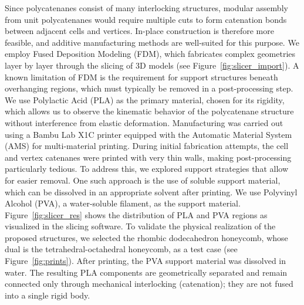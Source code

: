 \documentclass[times,twocolumn,final]{elsarticle}
\begin{document}
Since polycatenanes consist of many interlocking structures, modular assembly from unit polycatenanes would require multiple cuts to form catenation bonds between adjacent cells and vertices. In-place construction is therefore more feasible, and additive manufacturing methods are well-suited for this purpose. We employ Fused Deposition Modeling (FDM), which fabricates complex geometries layer by layer through the slicing of 3D models (see Figure~\ref{fig:slicer_import}). A known limitation of FDM is the requirement for support structures beneath overhanging regions, which must typically be removed in a post-processing step.
We use Polylactic Acid (PLA) as the primary material, chosen for its rigidity, which allows us to observe the kinematic behavior of the polycatenane structure without interference from elastic deformation. Manufacturing was carried out using a Bambu Lab X1C printer equipped with the Automatic Material System (AMS) for multi-material printing. During initial fabrication attempts, the cell and vertex catenanes were printed with very thin walls, making post-processing particularly tedious. To address this, we explored support strategies that allow for easier removal.
One such approach is the use of soluble support material, which can be dissolved in an appropriate solvent after printing. We use Polyvinyl Alcohol (PVA), a water-soluble filament, as the support material. Figure~\ref{fig:slicer_res} shows the distribution of PLA and PVA regions as visualized in the slicing software. To validate the physical realization of the proposed structures, we selected the rhombic dodecahedron honeycomb, whose dual is the tetrahedral-octahedral honeycomb, as a test case (see Figure~\ref{fig:prints}).
{\color{red}After printing, the PVA support material was dissolved in water. The resulting PLA components are geometrically separated and remain connected only through mechanical interlocking (catenation); they are not fused into a single rigid body.}
\end{document}
